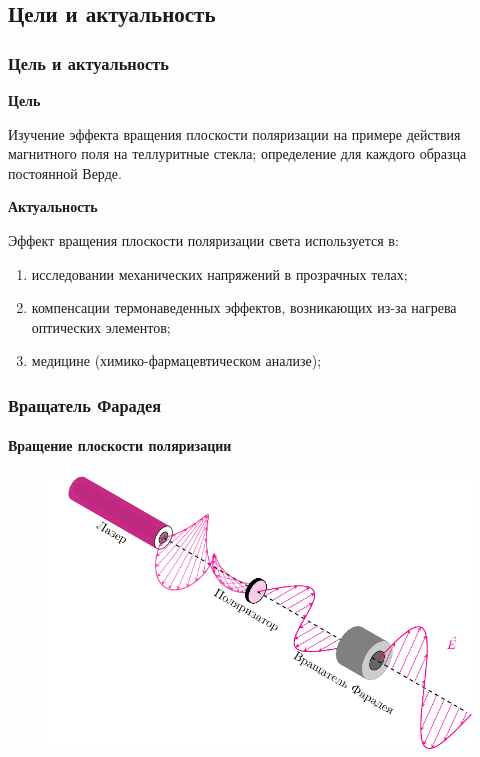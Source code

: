 \documentclass[12pt,pdf,hyperref={unicode}, dvipsnames]{beamer}
\begin{document}
\subsection{Цели и актуальность}
\begin{frame}[t]
  \frametitle{Цель и актуальность}
 \textbf{Цель}

  Изучение эффекта вращения плоскости поляризации на примере действия магнитного поля на теллуритные стекла; определение для каждого образца постоянной Верде.

\textbf{Актуальность}

    Эффект вращения плоскости поляризации света используется в:

  \begin{enumerate}
	 \item исследовании механических напряжений в прозрачных телах;
	\item компенсации термонаведенных эффектов, возникающих из-за нагрева оптических элементов;
	\item медицине (химико-фармацевтическом анализе);
  \end{enumerate}
\end{frame}

\begin{frame}[t]
  \frametitle{Вращатель Фарадея}
  \framesubtitle{Вращение плоскости поляризации}

  \begin{figure}[tb]
    \centering
    \includegraphics[width=\textwidth]{img/polarizing}
  \end{figure}
\end{frame}
\end{document}
